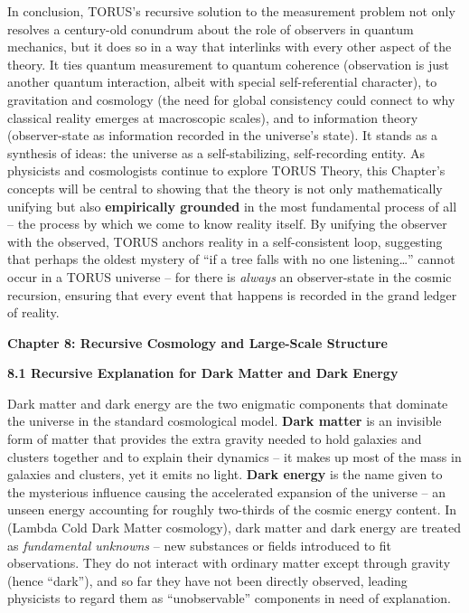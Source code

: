\documentclass[
]{article}
\begin{document}
{In conclusion, TORUS's recursive solution to the measurement problem not
only resolves a century-old conundrum about the role of observers in
quantum mechanics, but it does so in a way that interlinks with every
other aspect of the theory. It ties quantum measurement to quantum
coherence (observation is just another quantum interaction, albeit with
special self-referential character), to gravitation and cosmology (the
need for global consistency could connect to why classical reality
emerges at macroscopic scales), and to information theory
(observer-state as information recorded in the universe's state). It
stands as a synthesis of ideas: the universe as a self-stabilizing,
self-recording entity. As physicists and cosmologists continue to
explore TORUS Theory, this Chapter's concepts will be central to showing
that the theory is not only mathematically unifying but also
\textbf{empirically grounded} in the most fundamental process of all --
the process by which we come to know reality itself. By unifying the
observer with the observed, TORUS anchors reality in a self-consistent
loop, suggesting that perhaps the oldest mystery of ``if a tree falls
with no one listening\ldots'' cannot occur in a TORUS universe -- for
there is \emph{always} an observer-state in the cosmic recursion,
ensuring that every event that happens is recorded in the grand ledger
of reality.

\textbf{Chapter 8: Recursive Cosmology and Large-Scale Structure}

\textbf{8.1 Recursive Explanation for Dark Matter and Dark Energy}

Dark matter and dark energy are the two enigmatic components that
dominate the universe in the standard cosmological model. \textbf{Dark
matter} is an invisible form of matter that provides the extra gravity
needed to hold galaxies and clusters together and to explain their
dynamics -- it makes up most of the mass in galaxies and clusters, yet
it emits no light\hspace{0pt}. \textbf{Dark energy} is the name given to
the mysterious influence causing the accelerated expansion of the
universe -- an unseen energy accounting for roughly two-thirds of the
cosmic energy content. In \LambdaCDM (Lambda Cold Dark Matter cosmology), dark
matter and dark energy are treated as \emph{fundamental unknowns} -- new
substances or fields introduced to fit observations. They do not
interact with ordinary matter except through gravity (hence ``dark''),
and so far they have not been directly observed, leading physicists to
regard them as ``unobservable'' components in need of explanation.

}
\end{document}
